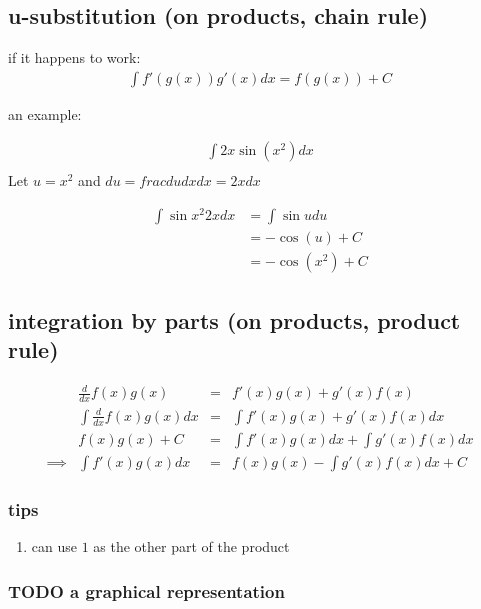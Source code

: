 \documentclass[letterpaper]{article}
\begin{document}
\subsection{u-substitution (on products, chain rule)}
\label{sec:org21c4f75}
if it happens to work:
\[\begin{aligned}
   \int f'(g(x)) g'(x)dx = f(g(x)) + C
   \end{aligned}\]

an example:

\[\begin{aligned}
   \int 2x \sin (x^2) dx\\
   \end{aligned}\]
Let \(u = x^2\) and \(du = frac{du}{dx} dx = 2x dx\)

\[\begin{aligned}
   \int \sin x^2 2x dx &= \int \sin u du\\
   &= -\cos (u) +C\\
   &= -\cos (x^2) +C
   \end{aligned}\]

\subsection{integration by parts (on products, product rule)}
\label{sec:orge90b4cc}


\[\begin{aligned}
   &\frac{d}{dx}f(x)g(x) &=& f'(x)g(x) + g'(x)f(x)\\
   &\int \frac{d}{dx}f(x)g(x) dx &=& \int  f'(x)g(x) + g'(x)f(x) dx\\
   &f(x)g(x)+C &=& \int f'(x)g(x) dx + \int g'(x)f(x) dx\\
   \implies & \int f'(x)g(x) dx &=& f(x)g(x) - \int g'(x)f(x) dx +C
   \end{aligned}\]

\subsubsection{tips}
\label{sec:org7a1bc7d}

\begin{enumerate}
\item can use \(1\) as the other part of the product
\label{sec:org6c12329}
\end{enumerate}

\subsubsection{{\bfseries\sffamily TODO} a graphical representation}
\label{sec:org3536991}
\end{document}
